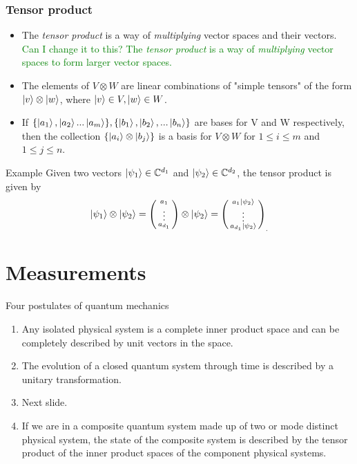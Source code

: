 \documentclass[handout, 10 pt]{beamer}
\newcommand{\icol}[1]{%
  \left(\begin{smallmatrix}#1\end{smallmatrix}\right)%
}
\begin{document}
\begin{frame}
\frametitle{Tensor product}
\begin{itemize}
    \item The \textit{tensor product} is a way of {\emph{multiplying}} vector spaces and their vectors. \textcolor{green}{Can I change it to this? The \textit{tensor product} is a way of {\emph{multiplying}} vector spaces to form larger vector spaces.}
    \pause
    \item The elements of $V \otimes W$ are linear combinations of "simple tensors" of the form $\ket{v} \otimes \ket{w}$, where $\ket{v} \in V, \ket{w} \in W$. 
    \pause
    \item If $\{\ket{a_1}, \ket{a_2}...\ket{a_m}\}, \{\ket{b_1},\ket{b_2}, ...\ket{b_n}\}$ are bases for V and W respectively, then the collection $\{\ket{a_i}\otimes\ket{b_j}\}$ is a basis for $V \otimes W$ for $1\leq i \leq m$ and $1 \leq j \leq n$.
\end{itemize}
\pause
\begin{block}{Example}
Given two vectors $\ket{\psi_1}\in\mathbb{C}^{d_1}$ and $\ket{\psi_2}\in\mathbb{C}^{d_2}$, the tensor product is given by
\begin{equation}
\ket{\psi_1} \otimes\ket{\psi_2} = \icol{ a_1\\ \vdots \\ a_{d_1}} \otimes \ket{\psi_2} = {\icol{ a_1\ket{\psi_2}\\ \vdots \\a_{d_1}\ket{\psi_2}}}_.
\end{equation}
\end{block}
\end{frame}

\section{Measurements}
\begin{comment}
Note the following description is not mathematically rigorous.
\end{comment}

\begin{frame}{Four postulates of quantum mechanics}
    \begin{enumerate}
        \item Any isolated physical system is a complete inner product space and can be completely described by unit vectors in the space.
        \pause
        \item The evolution of a closed quantum system through time is described by a unitary transformation.
        \pause
        \item Next slide.
        \pause
        \item If we are in a composite quantum system made up of two or mode distinct physical system, the state of the composite system is described by the tensor product of the inner product spaces of the component physical systems. 
    \end{enumerate}
\end{frame}
\end{document}
